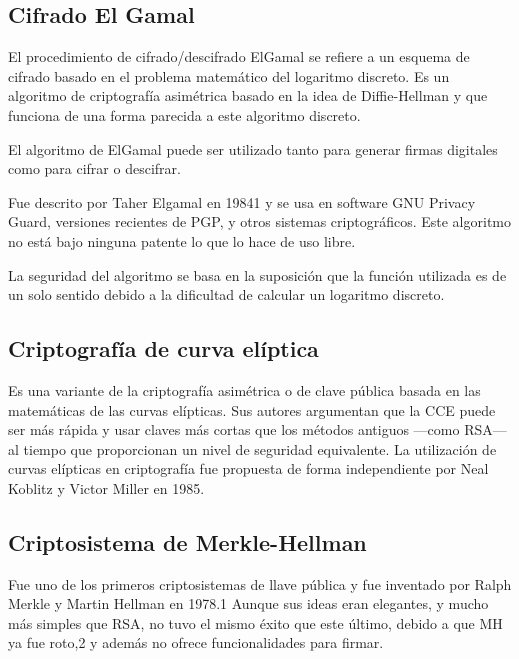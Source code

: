\documentclass[12pt]{article}
\begin{document}
\par


\vspace{\baselineskip}
\subsection{Cifrado El Gamal}
El procedimiento de cifrado/descifrado ElGamal se refiere a un esquema de cifrado basado en el problema matemático del logaritmo discreto. Es un algoritmo de criptografía asimétrica basado en la idea de Diffie-Hellman y que funciona de una forma parecida a este algoritmo discreto.\par

El algoritmo de ElGamal puede ser utilizado tanto para generar firmas digitales como para cifrar o descifrar.\par

Fue descrito por Taher Elgamal en 19841​ y se usa en software GNU Privacy Guard, versiones recientes de PGP, y otros sistemas criptográficos. Este algoritmo no está bajo ninguna patente lo que lo hace de uso libre.\par

La seguridad del algoritmo se basa en la suposición que la función utilizada es de un solo sentido debido a la dificultad de calcular un logaritmo discreto.\par

\par

\subsection{Criptografía de curva elíptica}
Es una variante de la criptografía asimétrica o de clave pública basada en las matemáticas de las curvas elípticas. Sus autores argumentan que la CCE puede ser más rápida y usar claves más cortas que los métodos antiguos —como RSA— al tiempo que proporcionan un nivel de seguridad equivalente. La utilización de curvas elípticas en criptografía fue propuesta de forma independiente por Neal Koblitz y Victor Miller en 1985.\par

\par


\vspace{\baselineskip}
\par

\subsection{Criptosistema de Merkle-Hellman}
Fue uno de los primeros criptosistemas de llave pública y fue inventado por Ralph Merkle y Martin Hellman en 1978.1​ Aunque sus ideas eran elegantes, y mucho más simples que RSA, no tuvo el mismo éxito que este último, debido a que MH ya fue roto,2​ y además no ofrece funcionalidades para firmar.\par
\end{document}
